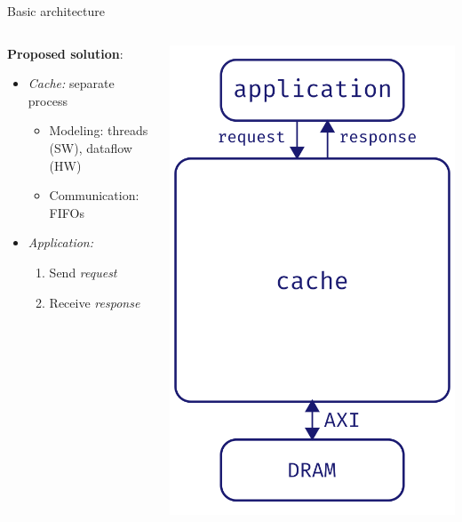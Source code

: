 \documentclass[aspectratio=169]{beamer}
\begin{document}
\begin{frame}{Basic architecture}
\begin{columns}[c]
\begin{column}{.55\textwidth}
			\bigskip
			\textbf{Proposed solution}:
			\begin{itemize}
				\item \emph{Cache:} separate process
					\begin{itemize}
						\item Modeling: threads (SW), dataflow (HW)
						\item Communication: FIFOs
					\end{itemize}
				\item \emph{Application:}
					\begin{enumerate}
						\item Send \emph{request}
						\item Receive \emph{response}
					\end{enumerate}
			\end{itemize}
		\end{column}
		\begin{column}{.5\textwidth}
			\begin{center}
			\includegraphics[height=.7\textheight]{complete_arch}
			\end{center}
		\end{column}
	\end{columns}
\end{frame}
\end{document}
